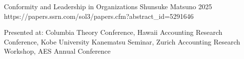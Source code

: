 \paperentry
	{Conformity and Leadership in Organizations}
	{Shunsuke Matsuno}
	{2025}
	{https://papers.ssrn.com/sol3/papers.cfm?abstract_id=5291646}
	{}
	{}
	{
	\begin{cvitems} %
		\item {Presented at: Columbia Theory Conference, Hawaii Accounting Research Conference, Kobe University Kanematsu Seminar, Zurich Accounting Research Workshop, AES Annual Conference}
	\end{cvitems}
	}

\vspace{.3cm}





	
